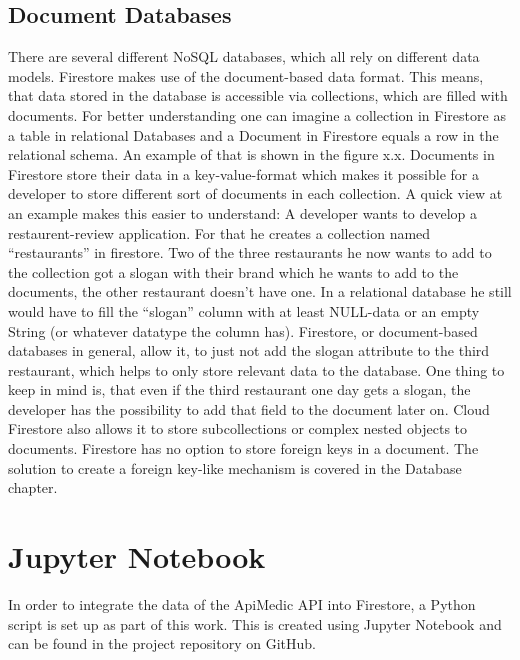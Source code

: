 \subsection{Document Databases}
There are several different NoSQL databases, which all rely on different data models. Firestore makes use of the document-based data format. This means, that data stored in the database is accessible via collections, which are filled with documents. For better understanding one can imagine a collection in Firestore as a table in relational Databases and a Document in Firestore equals a row in the relational schema. An example of that is shown in the figure x.x. Documents in Firestore store their data in a key-value-format which makes it possible for a developer to store different sort of documents in each collection. A quick view at an example makes this easier to understand: A developer wants to develop a restaurent-review application. For that he creates a collection named “restaurants” in firestore. Two of the three restaurants he now wants to add to the collection got a slogan with their brand which he wants to add to the documents, the other restaurant doesn’t have one. In a relational database he still would have to fill the “slogan” column with at least NULL-data or an empty String (or whatever datatype the column has). Firestore, or document-based databases in general, allow it, to just not add the slogan attribute to the third restaurant, which helps to only store relevant data to the database. One thing to keep in mind is, that even if the third restaurant one day gets a slogan, the developer has the possibility to add that field to the document later on. Cloud Firestore also allows it to store subcollections or complex nested objects to documents. Firestore has no option to store foreign keys in a document. The solution to create a foreign key-like mechanism is covered in the Database chapter. 

\section{Jupyter Notebook}
In order to integrate the data of the ApiMedic API into Firestore, a Python script is set up as part of this work. This is created using Jupyter Notebook and can be found in the project repository on GitHub.